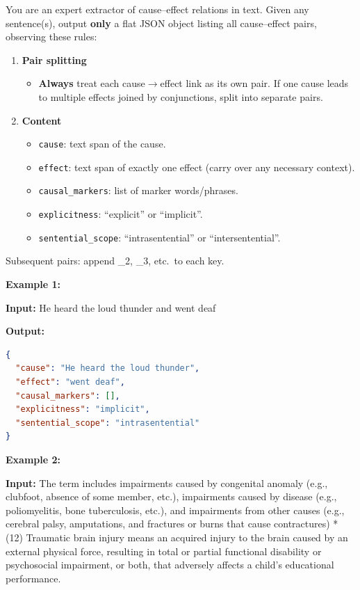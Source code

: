 \documentclass[conference]{IEEEtran}
\begin{document}
\begin{tcolorbox}[
  title=\textbf{2.  Experiment 2: Few-Shot Incontext Learning Prompt},
  colback=gray!5,
  colframe=black!75,
  fonttitle=\bfseries,
  breakable
]
You are an expert extractor of cause--effect relations in text. Given any sentence(s), output \textbf{only} a flat JSON object listing all cause--effect pairs, observing these rules:
\begin{enumerate}[label=\arabic*.]
  \item \textbf{Pair splitting}
    \begin{itemize}
      \item \textbf{Always} treat each cause$\to$effect link as its own pair. If one cause leads to multiple effects joined by conjunctions, split into separate pairs.
    \end{itemize}
  \item \textbf{Content}
    \begin{itemize}
      \item \texttt{cause}: text span of the cause.
      \item \texttt{effect}: text span of exactly one effect (carry over any necessary context).
      \item \texttt{causal\_markers}: list of marker words/phrases.
      \item \texttt{explicitness}: ``explicit'' or ``implicit''.
      \item \texttt{sentential\_scope}: ``intrasentential'' or ``intersentential''.
    \end{itemize}
\end{enumerate}
Subsequent pairs: append \_2, \_3, etc.\ to each key.

\textbf{Example 1:}

\textbf{Input:} He heard the loud thunder and went deaf

\textbf{Output:}
\begin{lstlisting}[language=JSON]
{
  "cause": "He heard the loud thunder",
  "effect": "went deaf",
  "causal_markers": [],
  "explicitness": "implicit",
  "sentential_scope": "intrasentential"
}
\end{lstlisting}

\textbf{Example 2:}

\textbf{Input:} The term includes impairments caused by congenital anomaly (e.g., clubfoot, absence of some member, etc.), impairments caused by disease (e.g., poliomyelitis, bone tuberculosis, etc.), and impairments from other causes (e.g., cerebral palsy, amputations, and fractures or burns that cause contractures) * (12) Traumatic brain injury means an acquired injury to the brain caused by an external physical force, resulting in total or partial functional disability or psychosocial impairment, or both, that adversely affects a child's educational performance.


\end{tcolorbox}
\end{document}
